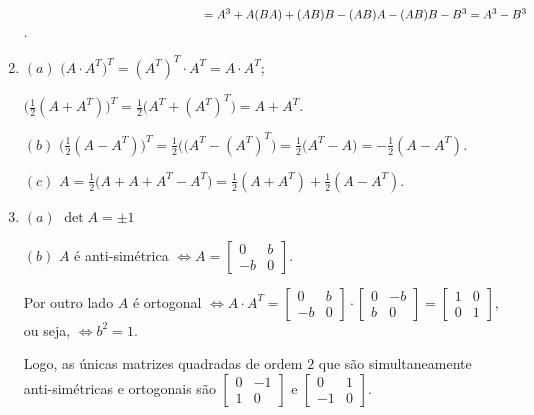 \documentclass{report}
\begin{document}
\begin{enumerate}
$\hspace{5.3cm}=A^3 +A(BA) +(AB)B-(AB)A-(AB)B-B^3= A^3 - B^3$.


\item $(a)$ $\Big(A\cdot A^T\Big)^T=(A^T)^T\cdot A^T=A \cdot A^T$;

\hspace{0.7cm}
$\Big(\frac{1}{2}(A+A^T)\Big)^T=\frac{1}{2}\Big(A^T+ (A^T)^T\Big)=
A +A^T.$

$(b)$
$\Big(\frac{1}{2}(A-A^T)\Big)^T=\frac{1}{2}\Big((A^T-(A^T)^T\Big)=
\frac{1}{2}\Big(A^T- A\Big)= -\frac{1}{2}(A-A^T).$

$(c)$ $A =
\frac{1}{2}\Big(A+A+A^T-A^T\Big)=\frac{1}{2}(A+A^T)+\frac{1}{2}(A-A^T)$.


\item $(a)$ $\det A = \pm 1$

$(b)$ $A$ é anti-simétrica $\Leftrightarrow A=\left[
\begin{array}{rr}
0 & b \\
-b & 0
\end{array}
\right]$.

Por outro lado $A$ é ortogonal $\Leftrightarrow A \cdot A^T
=\left[
\begin{array}{rr}
0 & b \\
-b & 0
\end{array}
\right] \cdot \left[
\begin{array}{rr}
0 & -b \\
b & 0
\end{array}
\right]= \left[
\begin{array}{rr}
1 & 0 \\
0 & 1
\end{array}
\right]$, ou seja, $\Leftrightarrow b^2=1$.

Logo, as únicas matrizes quadradas de ordem $2$ que são
simultaneamente anti-simétricas e ortogonais são $\left[
\begin{array}{rr}
0 & -1 \\
1 & 0
\end{array}
\right]$ e $\left[
\begin{array}{rr}
0 & 1 \\
-1 & 0
\end{array}
\right]$.


\end{enumerate}
\end{document}
